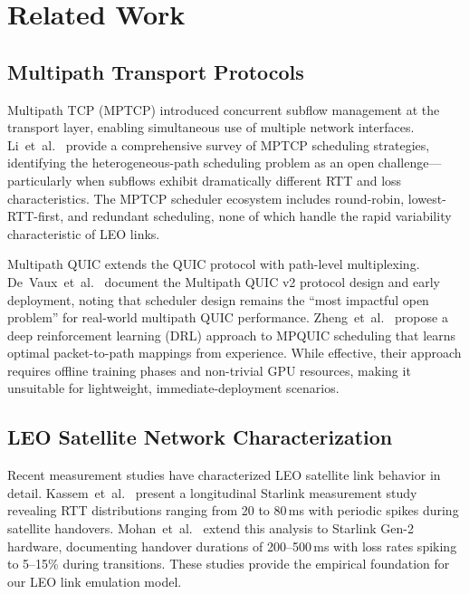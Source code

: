 \documentclass[conference,10pt]{IEEEtran}
\begin{document}
\section{Related Work}
\label{sec:related}

\subsection{Multipath Transport Protocols}

Multipath TCP (MPTCP) introduced concurrent subflow management at the transport layer, enabling simultaneous use of multiple network interfaces.
Li~et~al.~\cite{li2025mptcp} provide a comprehensive survey of MPTCP scheduling strategies, identifying the heterogeneous-path scheduling problem as an open challenge—particularly when subflows exhibit dramatically different RTT and loss characteristics.
The MPTCP scheduler ecosystem includes round-robin, lowest-RTT-first, and redundant scheduling, none of which handle the rapid variability characteristic of LEO links.

Multipath QUIC extends the QUIC protocol with path-level multiplexing.
De~Vaux~et~al.~\cite{devaux2026mpquicv2} document the Multipath QUIC v2 protocol design and early deployment, noting that scheduler design remains the ``most impactful open problem'' for real-world multipath QUIC performance.
Zheng~et~al.~\cite{zheng2025mpquic} propose a deep reinforcement learning (DRL) approach to MPQUIC scheduling that learns optimal packet-to-path mappings from experience.
While effective, their approach requires offline training phases and non-trivial GPU resources, making it unsuitable for lightweight, immediate-deployment scenarios.

\subsection{LEO Satellite Network Characterization}

Recent measurement studies have characterized LEO satellite link behavior in detail.
Kassem~et~al.~\cite{kassem2025starlink} present a longitudinal Starlink measurement study revealing RTT distributions ranging from 20 to 80\,ms with periodic spikes during satellite handovers.
Mohan~et~al.~\cite{mohan2026starlinkv2} extend this analysis to Starlink Gen-2 hardware, documenting handover durations of 200--500\,ms with loss rates spiking to 5--15\% during transitions.
These studies provide the empirical foundation for our LEO link emulation model.
\end{document}
